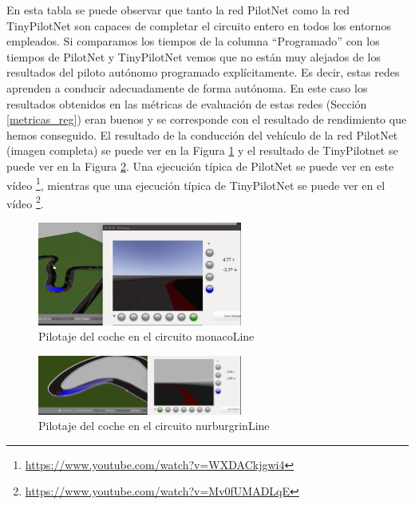 En esta tabla se puede observar que tanto la red PilotNet como la red TinyPilotNet son capaces de completar el circuito entero en todos los entornos empleados. Si comparamos los tiempos de la columna ``Programado'' con los tiempos de PilotNet y TinyPilotNet vemos que no están muy alejados de los resultados del piloto autónomo programado explícitamente. Es decir, estas redes aprenden a conducir adecuadamente de forma autónoma. En este caso los resultados obtenidos en las métricas de evaluación de estas redes (Sección \ref{metricas_reg}) eran buenos y se corresponde con el resultado de rendimiento que hemos conseguido. El resultado de la conducción del vehículo de la red PilotNet (imagen completa) se puede ver en la Figura \ref{fig.monaco_reg} y el resultado de TinyPilotnet se puede ver en la Figura \ref{fig.nurburgrin_reg}. Una ejecución típica de PilotNet se puede ver en este vídeo  \footnote{\url{https://www.youtube.com/watch?v=WXDACkjgwi4}}, mientras que una ejecución típica de TinyPilotNet se puede ver en el vídeo \footnote{\url{https://www.youtube.com/watch?v=Mv0fUMADLqE}}.\\

\begin{figure}
\begin{center}
	\includegraphics[width=0.6\textwidth]{figures/Regresion/monaco_reg.png}
   \caption{Pilotaje del coche en el circuito monacoLine}
	\label{fig.monaco_reg}
\end{center}
\end{figure}

\begin{figure}
\begin{center}
	\includegraphics[width=0.6\textwidth]{figures/Regresion/tinypilotnet_completa.png}
   \caption{Pilotaje del coche en el circuito nurburgrinLine}
	\label{fig.nurburgrin_reg}
\end{center}
\end{figure}




